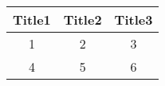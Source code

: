 \documentclass[12pt, letterpaper]{article}
\begin{document}
\begin{tabular}{|c|c|c|}
\hline
Title1& Title2& Title3\\
\hline
1& 2& 3\\
\hline
4& 5& 6\\
\hline
\end{tabular}
\end{document}
